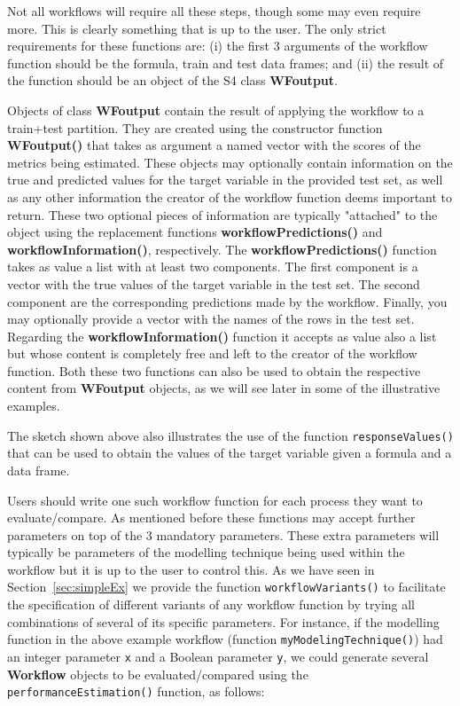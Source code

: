 \documentclass[10pt,a4paper]{article}\usepackage[]{graphicx}\usepackage[]{color}
\begin{document}
Not all workflows will require all these steps, though some may even
require more. This is clearly something that is up to the user. The
only strict requirements for these functions are: (i) the first 3 arguments
of the workflow function should be the formula, train and test data
frames; and (ii) the result of the function should be an object of the S4 class \textbf{WFoutput}.

Objects of class \textbf{WFoutput} contain the result of applying the workflow to a train+test partition. They are created using the constructor function \textbf{WFoutput()} that takes as argument a named vector with the scores of the metrics being estimated. These objects may optionally contain information on the true and predicted values for the target variable in the provided test set, as well as any other information the creator of the workflow function deems important to return. These two optional pieces of information are typically "attached" to the object using the replacement functions \textbf{workflowPredictions()}  and \textbf{workflowInformation()}, respectively. The \textbf{workflowPredictions()} function takes as value a list with at least two components. The first component is a vector with the true values of the target variable in the test set. The second component are the corresponding predictions made by the workflow. Finally, you may optionally provide a vector with the names of the rows in the test set. Regarding the \textbf{workflowInformation()} function it accepts as value also a list but whose content is completely free and left to the creator of the workflow function. Both these two functions can also be used to obtain the respective content from \textbf{WFoutput} objects, as we will see later in some of the illustrative examples.

The sketch shown above also illustrates the use of the function
\texttt{responseValues()} that can be used to obtain the values of the target
variable given a formula and a data frame.

Users should write one such workflow function for each process they
want to evaluate/compare. As mentioned before these functions may
accept further parameters on top of the 3 mandatory parameters. These
extra parameters will typically be parameters of the modelling
technique being used within the workflow but it is up to the user to
control this. As we have seen in Section~\ref{sec:simpleEx} we provide
the function \texttt{workflowVariants()} to facilitate the specification of
different variants of any workflow function by trying all combinations
of several of its specific parameters. For instance, if the modelling
function in the above example workflow (function
\texttt{myModelingTechnique()}) had an integer parameter \texttt{x}
and a Boolean parameter \texttt{y}, we could generate several
\textbf{Workflow} objects to be evaluated/compared using the
\texttt{performanceEstimation()} function, as follows:
\end{document}
